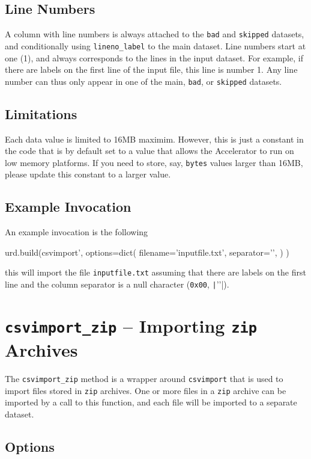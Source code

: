 \subsection{Line Numbers}
A column with line numbers is always attached to the \texttt{bad}
and \texttt{skipped} datasets, and conditionally
using \texttt{lineno\_label} to the main dataset.  Line numbers start
at one (1), and always corresponds to the lines in the input dataset.
For example, if there are labels on the first line of the input file,
this line is number 1.  Any line number can thus only appear in one of
the main, \texttt{bad}, or \texttt{skipped} datasets.


\subsection{Limitations}
Each data value is limited to 16MB maximim.  However, this is just a
constant in the code that is by default set to a value that allows the
Accelerator to run on low memory platforms.  If you need to store,
say, \texttt{bytes} values larger than 16MB, please update this
constant to a larger value.


\subsection{Example Invocation}
An example invocation is the following

\begin{python}
urd.build(csvimport',
    options=dict(
        filename='inputfile.txt',
        separator='\0',
    )
)
\end{python}
this will import the file \texttt{inputfile.txt} assuming that there
are labels on the first line and the column separator is a null
character (\texttt{0x00}, \texttt|'\0'|).



\clearpage
\section{\texttt{csvimport\_zip} -- Importing \texttt{zip} Archives}
The \texttt{csvimport\_zip} method is a wrapper
around \texttt{csvimport} that is used to import files stored in
\texttt{zip} archives.  One or more files in a \texttt{zip} archive
can be imported by a call to this function, and each file will be
imported to a separate dataset.


\subsection{Options}

